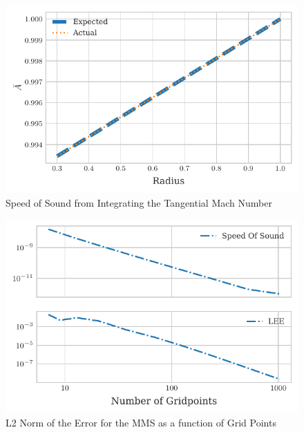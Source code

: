 \documentclass{article}
\begin{document}
 \begin{figure}
     \centering
         \includegraphics{tex-outputs/SoundSpeedFromIntegration.pdf}
     \caption{Speed of Sound from Integrating the Tangential Mach Number}
 \end{figure}

 \begin{figure}
     \centering
         \includegraphics{tex-outputs/L2.pdf}
     \caption{L2 Norm of the Error for the MMS as a function of Grid Points}
 \end{figure}
\end{document}
